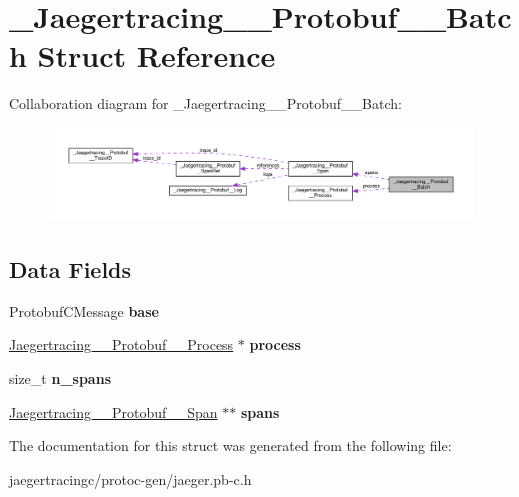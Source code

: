 \hypertarget{struct__Jaegertracing____Protobuf____Batch}{}\section{\+\_\+\+Jaegertracing\+\_\+\+\_\+\+Protobuf\+\_\+\+\_\+\+Batch Struct Reference}
\label{struct__Jaegertracing____Protobuf____Batch}


Collaboration diagram for \+\_\+\+Jaegertracing\+\_\+\+\_\+\+Protobuf\+\_\+\+\_\+\+Batch\+:
\nopagebreak
\begin{figure}[H]
\begin{center}
\leavevmode
\includegraphics[width=350pt]{struct__Jaegertracing____Protobuf____Batch__coll__graph}
\end{center}
\end{figure}
\subsection*{Data Fields}
\begin{DoxyCompactItemize}
\item 
\mbox{\label{struct__Jaegertracing____Protobuf____Batch_aa43b048896fce2d2cca215be2c106640}} 
Protobuf\+C\+Message {\bfseries base}
\item 
\mbox{\label{struct__Jaegertracing____Protobuf____Batch_a70330d10df460a560fb7c883e01f300c}} 
\mbox{\hyperlink{struct__Jaegertracing____Protobuf____Process}{Jaegertracing\+\_\+\+\_\+\+Protobuf\+\_\+\+\_\+\+Process}} $\ast$ {\bfseries process}
\item 
\mbox{\label{struct__Jaegertracing____Protobuf____Batch_ad3006039463dc123e716adb10dc3e900}} 
size\+\_\+t {\bfseries n\+\_\+spans}
\item 
\mbox{\label{struct__Jaegertracing____Protobuf____Batch_a9266661ae189a3ece29e5e7c060efcbd}} 
\mbox{\hyperlink{struct__Jaegertracing____Protobuf____Span}{Jaegertracing\+\_\+\+\_\+\+Protobuf\+\_\+\+\_\+\+Span}} $\ast$$\ast$ {\bfseries spans}
\end{DoxyCompactItemize}


The documentation for this struct was generated from the following file\+:\begin{DoxyCompactItemize}
\item 
jaegertracingc/protoc-\/gen/jaeger.\+pb-\/c.\+h\end{DoxyCompactItemize}
